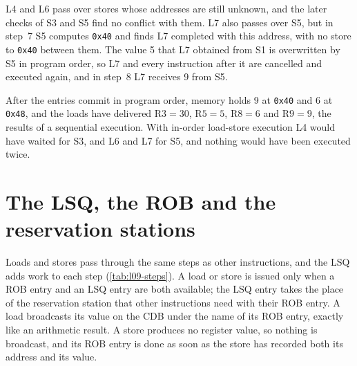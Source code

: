 \documentclass[../main.tex]{subfiles}
\begin{document}
L4 and L6 pass over stores whose addresses are still unknown, and the later
checks of S3 and S5 find no conflict with them.  L7 also passes over S5, but in
step~7 S5 computes \texttt{0x40} and finds L7 completed with this address, with
no store to \texttt{0x40} between them.  The value 5 that L7 obtained from S1
is overwritten by S5 in program order, so L7 and every instruction after it are
cancelled and executed again, and in step~8 L7 receives 9 from S5.

After the entries commit in program order, memory holds 9 at \texttt{0x40}
and 6 at \texttt{0x48}, and the loads have delivered $\text{R3}=30$,
$\text{R5}=5$, $\text{R8}=6$ and $\text{R9}=9$, the results of a sequential
execution.  With in-order load-store execution L4 would have waited for S3,
and L6 and L7 for S5, and nothing would have been executed twice.

\section{The LSQ, the ROB and the reservation stations}
\label{sec:l09-rob-rs}

Loads and stores pass through the same steps as other instructions, and the LSQ
adds work to each step (\cref{tab:l09-steps}).  A load or store is issued only when a ROB entry and an LSQ entry
are both available; the LSQ entry takes the place of the reservation station
that other instructions need with their ROB entry.  A load broadcasts
its value on the CDB under the name of its ROB entry, exactly like an
arithmetic result.  A store produces no register value, so nothing is
broadcast, and its ROB entry is done as soon as the store has recorded both its
address and its value.
\end{document}
